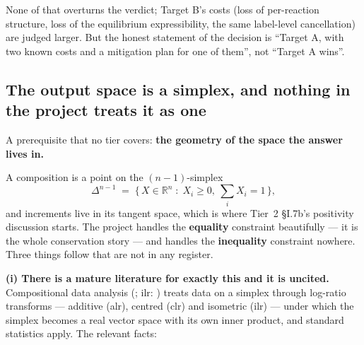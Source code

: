 None of that overturns the verdict; Target B's costs (loss of per-reaction
structure, loss of the equilibrium expressibility, the same label-level
cancellation) are judged larger. But the honest statement of the decision is
``Target A, with two known costs and a mitigation plan for one of them'', not
``Target A wins''.

\subsection{The output space is a simplex, and nothing in the project treats it as one}
\label{sec:simplex}

A prerequisite that no tier covers: \textbf{the geometry of the space the
answer lives in.}

A composition is a point on the $(n-1)$-simplex
%
\begin{equation}
\label{eq:simplex}
\Delta^{n-1} \;=\; \Big\{\,X \in \mathbb R^{n} \;:\; X_i \ge 0,\
\textstyle\sum_i X_i = 1 \,\Big\},
\end{equation}
%
and increments live in its tangent space, which is where Tier~2 \S I.7b's
positivity discussion starts. The project handles the \textbf{equality}
constraint beautifully --- it is the whole conservation story --- and handles
the \textbf{inequality} constraint nowhere. Three things follow that are not in
any register.

\textbf{(i) There is a mature literature for exactly this and it is uncited.}
Compositional data analysis (\citealt{aitchison1982, aitchison1986}; ilr:
\citealt{egozcue2003}) treats data on a simplex through log-ratio
transforms --- additive (alr), centred (clr) and isometric (ilr) --- under which
the simplex becomes a real vector space with its own inner product, and
standard statistics apply. The relevant facts:

